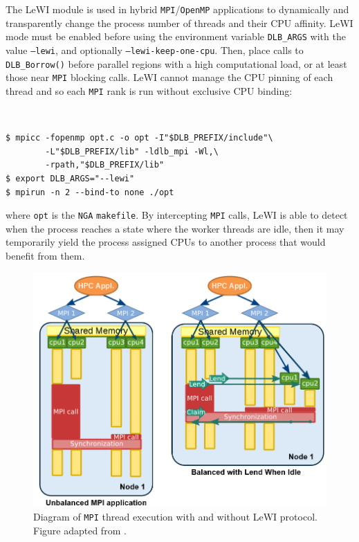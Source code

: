 \documentclass[letterpaper,twocolumn,10pt]{article}
\begin{document}
The LeWI module is used in hybrid \texttt{MPI}/\texttt{OpenMP} applications to dynamically and transparently change the process number of threads and their CPU affinity. LeWI mode must be enabled before using the environment variable \texttt{DLB\_ARGS} with the value \texttt{--lewi}, and optionally \texttt{--lewi-keep-one-cpu}. Then, place calls to \texttt{DLB\_Borrow()} before parallel regions with a high computational load, or at least those near \texttt{MPI} blocking calls. LeWI cannot manage the CPU pinning of each thread and so each \texttt{MPI} rank is run without exclusive CPU binding:

{\tt \small
\begin{verbatim}
$ mpicc -fopenmp opt.c -o opt -I"$DLB_PREFIX/include"\
        -L"$DLB_PREFIX/lib" -ldlb_mpi -Wl,\
        -rpath,"$DLB_PREFIX/lib"
$ export DLB_ARGS="--lewi"
$ mpirun -n 2 --bind-to none ./opt
\end{verbatim}
}
\noindent
where \texttt{opt} is the \texttt{NGA} \texttt{makefile}. By intercepting \texttt{MPI} calls, LeWI is able to detect when the process reaches a state where the worker threads are idle, then it may temporarily yield the process assigned CPUs to another process that would benefit from them.

\begin{figure}[h!]
    \centering
    \includegraphics[width=1.03\linewidth]{Figures/LeWI_Diagram.PNG}
    \caption{Diagram of \texttt{MPI} thread execution with and without LeWI protocol. Figure adapted from \cite{LeWI_ICPP09}.}
    \label{fig:Diagram_LeWI}
\end{figure}
\end{document}
